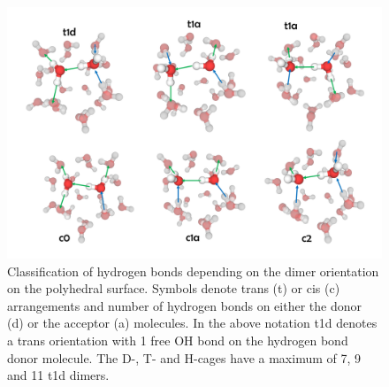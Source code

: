 \begin{figure}[t]
\uwsinglespace
\begin{center}
\includegraphics[width=\textwidth]{Figures/Chapter_6/sweb_types.png}
\end{center}
\begin{spacing}{1.0}
\caption[Classification of hydrogen bonds depending on the dimer orientation on the polyhedral surface. Symbols denote trans (t) or cis (c) arrangements and number of hydrogen bonds on either the donor (d) or the acceptor (a) molecules. In the above notation t1d denotes a trans orientation with 1 free OH bond on the hydrogen bond donor molecule. The D-, T- and H-cages have a maximum of 7, 9 and 11 t1d dimers.]{Classification of hydrogen bonds depending on the dimer orientation on the polyhedral surface. Symbols denote trans (t) or cis (c) arrangements and number of hydrogen bonds on either the donor (d) or the acceptor (a) molecules. In the above notation t1d denotes a trans orientation with 1 free OH bond on the hydrogen bond donor molecule. The D-, T- and H-cages have a maximum of 7, 9 and 11 t1d dimers.}\label{fig:MBE_III_F2}
\end{spacing}
\end{figure}